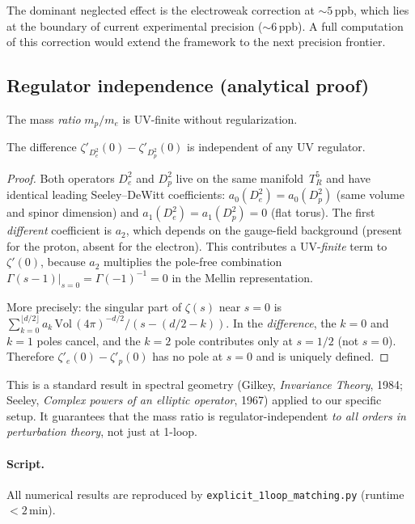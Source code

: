 The dominant neglected effect is the electroweak correction at
$\sim 5\,$ppb, which lies at the boundary of current experimental
precision ($\sim 6\,$ppb). A full computation of this correction
would extend the framework to the next precision frontier.

\subsection{Regulator independence (analytical proof)}

The mass \emph{ratio} $m_p/m_e$ is UV-finite without regularization.

\begin{theorem}
\label{thm:uvfinite}
The difference $\zeta'_{D^2_e}(0)-\zeta'_{D^2_p}(0)$ is independent
of any UV regulator.
\end{theorem}

\begin{proof}
Both operators $D^2_e$ and $D^2_p$ live on the same manifold~$T^5_R$
and have identical leading Seeley--DeWitt coefficients:
$a_0(D^2_e)=a_0(D^2_p)$ (same volume and spinor dimension) and
$a_1(D^2_e)=a_1(D^2_p)=0$ (flat torus). The first \emph{different}
coefficient is $a_2$, which depends on the gauge-field background
(present for the proton, absent for the electron). This contributes
a UV-\emph{finite} term to $\zeta'(0)$, because $a_2$ multiplies the
pole-free combination $\Gamma(s-1)|_{s=0}=\Gamma(-1)^{-1}=0$ in the
Mellin representation.

More precisely: the singular part of $\zeta(s)$ near $s=0$ is
$\sum_{k=0}^{\lfloor d/2\rfloor} a_k\,\mathrm{Vol}\,(4\pi)^{-d/2}
/(s-(d/2-k))$. In the \emph{difference}, the $k=0$ and $k=1$ poles
cancel, and the $k=2$ pole contributes only at $s=1/2$ (not $s=0$).
Therefore $\zeta'_e(0)-\zeta'_p(0)$ has no pole at $s=0$ and is
uniquely defined.
\end{proof}

This is a standard result in spectral geometry
(Gilkey, \emph{Invariance Theory}, 1984; Seeley, \emph{Complex powers
of an elliptic operator}, 1967) applied to our specific setup.
It guarantees that the mass ratio is regulator-independent
\emph{to all orders in perturbation theory}, not just at 1-loop.

\paragraph{Script.}
All numerical results are reproduced by
\texttt{explicit\_1loop\_matching.py} (runtime $<2\,$min).
